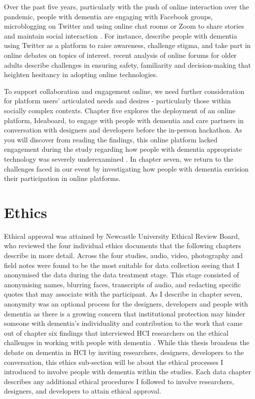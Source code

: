 Over the past five years, particularly with the push of online interaction over the pandemic, people with dementia are engaging with Facebook groups, microblogging on Twitter and using online chat rooms or Zoom to share stories and maintain social interaction \citep{lazar_safe_2019}. For instance, \cite{talbot_how_2020}describe people with dementia using Twitter as a platform to raise awareness, challenge stigma, and take part in online debates on topics of interest. \cite{johnson_older_2019} recent analysis of online forums for older adults describe challenges in ensuring safety, familiarity and decision-making that heighten hesitancy in adopting online technologies. 

To support collaboration and engagement online, we need further consideration for platform users' articulated needs and desires - particularly those within socially complex contexts. Chapter five explores the deployment of an online platform, Ideaboard, to engage with people with dementia and care partners in conversation with designers and developers before the in-person hackathon. As you will discover from reading the findings, this online platform lacked engagement during the study regarding how people with dementia appropriate technology was severely underexamined \citep{lindqvist2018contrasting} . In chapter seven, we return to the challenges faced in our event by investigating how people with dementia envision their participation in online platforms. 
\section{Ethics}
\label{Method:Ethics}
Ethical approval was attained by Newcastle University Ethical Review Board, who reviewed the four individual ethics documents that the following chapters describe in more detail. Across the four studies, audio, video, photography and field notes were found to be the most suitable for data collection seeing that I anonymised the data during the data treatment stage. This stage consisted of anonymising names, blurring faces, transcripts of audio, and redacting specific quotes that may associate with the participant. As I describe in chapter seven, anonymity was an optional process for the designers, developers and people with dementia as there is a growing concern that institutional protection may hinder someone with dementia's individuality and contribution to the work that came out of chapter six findings that interviewed HCI researchers on the ethical challenges in working with people with dementia \citep{hodge_relational_2020}. While this thesis broadens the debate on dementia in HCI by inviting researchers, designers, developers to the conversation, this ethics sub-section will be about the ethical processes I introduced to involve people with dementia within the studies. Each data chapter describes any additional ethical procedures I followed to involve researchers, designers, and developers to attain ethical approval.

